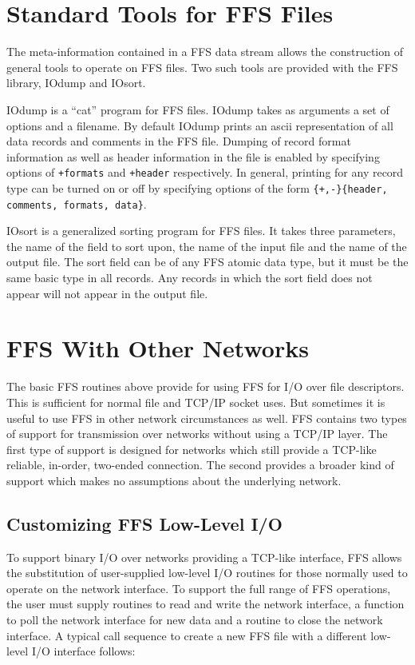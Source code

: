 \section{Standard Tools for FFS Files}
The meta-information contained in a FFS data stream allows the construction
of general tools to operate on FFS files.  Two such tools are provided with
the FFS library, IOdump and IOsort.

IOdump is a ``cat'' program for FFS files.  IOdump takes as arguments a set
of options and a filename.  By default IOdump prints an ascii representation
of all data records and comments in the FFS file.  Dumping of record format
information as well as header information in the file is enabled by specifying
options of {\tt +formats} and {\tt +header} respectively.  In general,
printing for any record type can be turned on or off by specifying options
of the form {\tt \{+,-\}\{header, comments, formats, data\}}.

IOsort is a generalized sorting program for FFS files.  It takes three
parameters, the name of the field to sort upon, the name of the input file and
the name of the output file.  The sort field can be of any FFS atomic data
type, but it must be the same basic type in all records.  Any records in which
the sort field does not appear will not appear in the output file.

\section{FFS With Other Networks}

The basic FFS routines above provide for using FFS for I/O over file
descriptors.  This is sufficient for normal file and TCP/IP socket uses.  But
sometimes it is useful to use FFS in other network circumstances as well.
FFS contains two types of support for transmission over networks without
using a TCP/IP layer.  The first type of support is designed for networks
which still provide a TCP-like reliable, in-order, two-ended connection.  The
second provides a broader kind of support which makes no assumptions about the
underlying network.

\subsection{Customizing FFS Low-Level I/O}

To support binary I/O over networks providing a TCP-like interface, FFS
allows the substitution of user-supplied low-level I/O routines for those
normally used to operate on the network interface.  To support the full range
of FFS operations, the user must supply routines to read and write the
network interface, a function to poll the network interface for new data and a
routine to close the network interface.  A typical call sequence to create a
new FFS file with a different low-level I/O interface follows:

